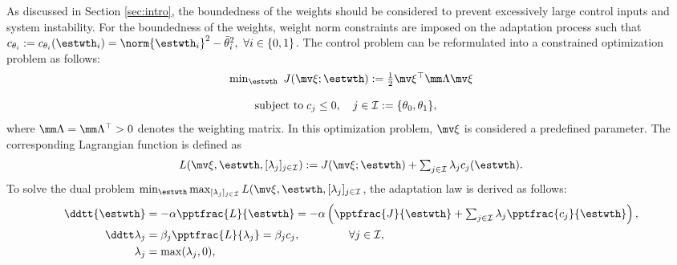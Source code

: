 \documentclass[letterpaper, 10 pt, conference]{ieeeconf}  %
\begin{document}
\color{red}
    As discussed in Section \ref{sec:intro}, the boundedness of the weights should be considered to prevent excessively large control inputs and system instability.
\color{black}
For the boundedness of the weights, weight norm constraints are imposed on the adaptation process such that $c_{\theta_i}:=c_{\theta_i}(\estwth_i)=\norm{{\estwth}_i}^2-\bar\theta^2_i,\ \forall i\in\{0,1\}$.
The control problem can be reformulated into a constrained optimization problem as follows:
\begin{equation}
    \begin{matrix}
        \min_{{\estwth}} \ J(\mv \xi;{\estwth})
        :=
        \tfrac{1}{2}
        \mv \xi^\top \mm \Lambda \mv \xi
        \\ \\
        \begin{aligned}
        \text{subject to\;}&c_{j}\le0, \quad j\in\mathcal I 
        := 
        \{\theta_0,\theta_1\}
        ,
        \end{aligned}
    \end{matrix}
\end{equation}
where $\mm \Lambda=\mm \Lambda^\top >0$ denotes the weighting matrix.
In this optimization problem, $\mv \xi$ is considered a predefined parameter.
The corresponding Lagrangian function is defined as
\begin{equation}
    L(
        \mv \xi,
        {\estwth},
        [\lambda_j]_{j\in\mathcal I}
    )
    := 
    J(\mv \xi;{\estwth})
    +
    \textstyle\sum_{j\in\mathcal I} \lambda_jc_j({\estwth})
    .
\end{equation}
To solve the dual problem $\min_{{\estwth}} \max_{[\lambda_j]_{j\in\mathcal I}}  L(\mv \xi,{\estwth},[\lambda_j]_{j\in\mathcal I}$, the adaptation law is derived as follows:
\begin{subequations}
    \begin{align}
            \ddtt {{\estwth}}
            &
            =
            -\alpha 
            \pptfrac{L}{{\estwth}}
            =-\alpha 
            \left(
                \pptfrac{J}{{\estwth}}
                +
                \textstyle\sum_{j\in\mathcal{I}}
                \lambda_j 
                \pptfrac{c_j}{\estwth}
            \right),
        \label{eq. adaptation law th}
            \\
            \ddtt\lambda_j
            & 
            = 
            \beta_j
            \pptfrac{L}{\lambda_j} 
            = 
            \beta_j c_j ,
            \quad\quad\quad\quad      \      
            \forall j\in\mathcal I,
        \label{eq. adaptation law L}
            \\
            \lambda_j 
            & 
            = 
            \max(\lambda_j,0) ,
        \label{eq. adaptation law L max}
    \end{align}
    \label{eq. adaptation laws}
\end{subequations}
\end{document}
